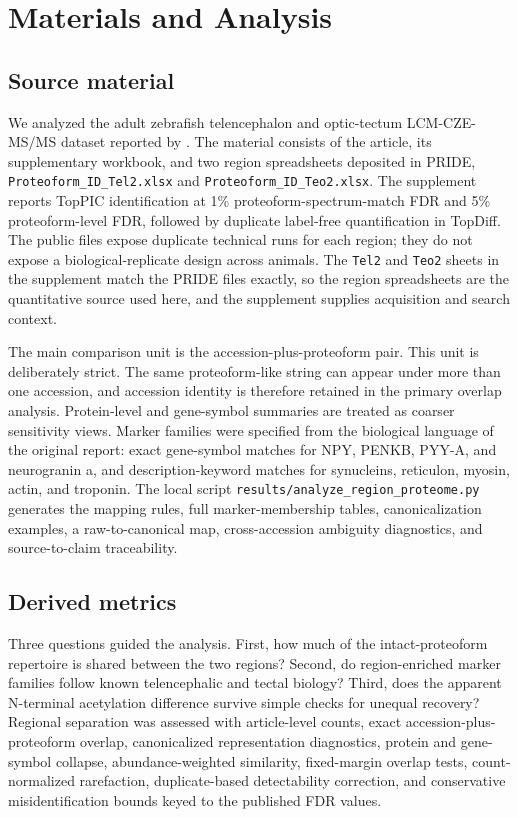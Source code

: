 \section{Materials and Analysis}

\subsection{Source material}

We analyzed the adult zebrafish telencephalon and optic-tectum LCM-CZE-MS/MS dataset reported by \citet{lubeckyj2022lcmcze}. The material consists of the article, its supplementary workbook, and two region spreadsheets deposited in PRIDE, \texttt{Proteoform\_ID\_Tel2.xlsx} and \texttt{Proteoform\_ID\_Teo2.xlsx}. The supplement reports TopPIC identification at 1\% proteoform-spectrum-match FDR and 5\% proteoform-level FDR, followed by duplicate label-free quantification in TopDiff. The public files expose duplicate technical runs for each region; they do not expose a biological-replicate design across animals. The \texttt{Tel2} and \texttt{Teo2} sheets in the supplement match the PRIDE files exactly, so the region spreadsheets are the quantitative source used here, and the supplement supplies acquisition and search context.

The main comparison unit is the accession-plus-proteoform pair. This unit is deliberately strict. The same proteoform-like string can appear under more than one accession, and accession identity is therefore retained in the primary overlap analysis. Protein-level and gene-symbol summaries are treated as coarser sensitivity views. Marker families were specified from the biological language of the original report: exact gene-symbol matches for NPY, PENKB, PYY-A, and neurogranin a, and description-keyword matches for synucleins, reticulon, myosin, actin, and troponin. The local script \texttt{results/analyze\_region\_proteome.py} generates the mapping rules, full marker-membership tables, canonicalization examples, a raw-to-canonical map, cross-accession ambiguity diagnostics, and source-to-claim traceability.

\subsection{Derived metrics}

Three questions guided the analysis. First, how much of the intact-proteoform repertoire is shared between the two regions? Second, do region-enriched marker families follow known telencephalic and tectal biology? Third, does the apparent N-terminal acetylation difference survive simple checks for unequal recovery? Regional separation was assessed with article-level counts, exact accession-plus-proteoform overlap, canonicalized representation diagnostics, protein and gene-symbol collapse, abundance-weighted similarity, fixed-margin overlap tests, count-normalized rarefaction, duplicate-based detectability correction, and conservative misidentification bounds keyed to the published FDR values.

